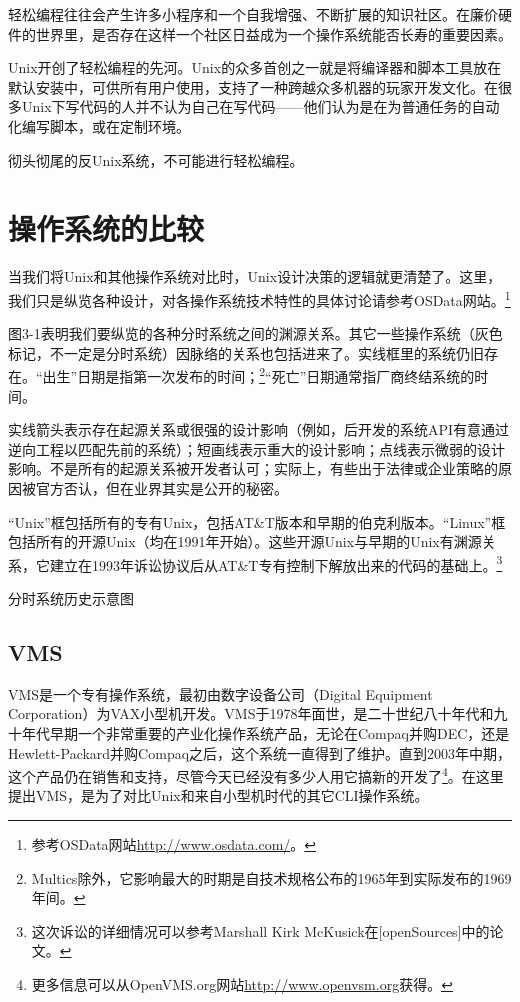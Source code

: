 \documentclass[12pt,oneside]{book}
\begin{document}
\begin{common-format}
轻松编程往往会产生许多小程序和一个自我增强、不断扩展的知识社区。在廉价硬件的世界里，是否存在这样一个社区日益成为一个操作系统能否长寿的重要因素。

Unix开创了轻松编程的先河。Unix的众多首创之一就是将编译器和脚本工具放在默认安装中，可供所有用户使用，支持了一种跨越众多机器的玩家开发文化。在很多Unix下写代码的人并不认为自己在写代码——他们认为是在为普通任务的自动化编写脚本，或在定制环境。

彻头彻尾的反Unix系统，不可能进行轻松编程。

\section{操作系统的比较}
当我们将Unix和其他操作系统对比时，Unix设计决策的逻辑就更清楚了。这里，我们只是纵览各种设计，对各操作系统技术特性的具体讨论请参考OSData网站。\footnote{参考OSData网站\href{http://www.osdata.com/}{http://www.osdata.com/}。}

图3-1表明我们要纵览的各种分时系统之间的渊源关系。其它一些操作系统（灰色标记，不一定是分时系统）因脉络的关系也包括进来了。实线框里的系统仍旧存在。“出生”日期是指第一次发布的时间；\footnote{Multics除外，它影响最大的时期是自技术规格公布的1965年到实际发布的1969年间。}“死亡”日期通常指厂商终结系统的时间。

实线箭头表示存在起源关系或很强的设计影响（例如，后开发的系统API有意通过逆向工程以匹配先前的系统）；短画线表示重大的设计影响；点线表示微弱的设计影响。不是所有的起源关系被开发者认可；实际上，有些出于法律或企业策略的原因被官方否认，但在业界其实是公开的秘密。

“Unix”框包括所有的专有Unix，包括AT\&{}T版本和早期的伯克利版本。“Linux”框包括所有的开源Unix（均在1991年开始）。这些开源Unix与早期的Unix有渊源关系，它建立在1993年诉讼协议后从AT\&{}T专有控制下解放出来的代码的基础上。\footnote{这次诉讼的详细情况可以参考Marshall Kirk McKusick在[openSources]中的论文。}

\begin{linefig}{分时系统历史示意图}
\label{fig:分时系统历史示意图}
\end{linefig}

\subsection{VMS}
VMS是一个专有操作系统，最初由数字设备公司（Digital Equipment Corporation）为VAX小型机开发。VMS于1978年面世，是二十世纪八十年代和九十年代早期一个非常重要的产业化操作系统产品，无论在Compaq并购DEC，还是Hewlett-Packard并购Compaq之后，这个系统一直得到了维护。直到2003年中期，这个产品仍在销售和支持，尽管今天已经没有多少人用它搞新的开发了\footnote{更多信息可以从OpenVMS.org网站\href{http://www.openvsm.org}{http://www.openvsm.org}获得。}。在这里提出VMS，是为了对比Unix和来自小型机时代的其它CLI操作系统。


\end{common-format}
\end{document}
